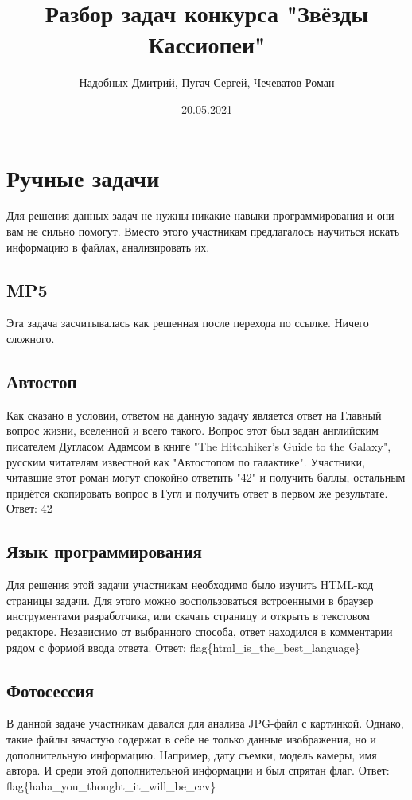 \documentclass[12pt]{article}
\title{Разбор задач конкурса "Звёзды Кассиопеи"}
\date{20.05.2021}
\author{Надобных Дмитрий, Пугач Сергей, Чечеватов Роман}
\begin{document}
	\maketitle
	\newpage
	\section{Ручные задачи}
	Для решения данных задач не нужны никакие навыки программирования и они вам не сильно помогут. Вместо этого участникам предлагалось научиться искать информацию в файлах, анализировать их.
	\newpage
	\subsection{MP5}
	Эта задача засчитывалась как решенная после перехода по ссылке. Ничего сложного.

	\newpage
	\subsection{Автостоп}
	Как сказано в условии, ответом на данную задачу является ответ на Главный вопрос жизни, вселенной и всего такого. Вопрос этот был задан английским писателем Дугласом Адамсом в книге "The Hitchhiker’s Guide to the Galaxy", русским читателям известной как "Автостопом по галактике". 
	\linebreak
	Участники, читавшие этот роман могут спокойно ответить "42" и получить баллы, остальным придётся скопировать вопрос в Гугл и получить ответ в первом же результате.
	\linebreak
	Ответ: 42
	
	\newpage
	\subsection{Язык программирования}
	Для решения этой задачи участникам необходимо было изучить HTML-код страницы задачи. Для этого можно воспользоваться встроенными в браузер инструментами разработчика, или скачать страницу и открыть в текстовом редакторе. Независимо от выбранного способа, ответ находился в комментарии рядом с формой ввода ответа.
	\linebreak
	Ответ: flag\{html\_is\_the\_best\_language\}

	\newpage
	\subsection{Фотосессия}
	В данной задаче участникам давался для анализа JPG-файл с картинкой. Однако, такие файлы зачастую содержат в себе не только данные изображения, но и дополнительную информацию. Например, дату съемки, модель камеры, имя автора. И среди этой дополнительной информации и был спрятан флаг.
	\linebreak
	 Ответ: flag\{haha\_you\_thought\_it\_will\_be\_ccv\}
\end{document}
